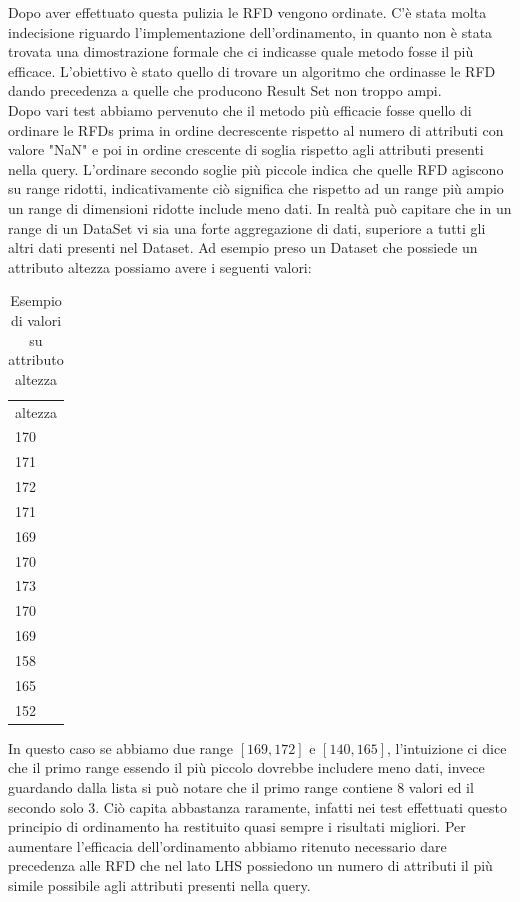 Dopo aver effettuato questa pulizia le RFD vengono ordinate. 
\newline
C'è stata molta indecisione riguardo l'implementazione dell'ordinamento, in quanto non è stata trovata una dimostrazione formale che ci indicasse quale metodo fosse il più efficace.
L'obiettivo è stato quello di trovare un algoritmo che ordinasse le RFD dando precedenza a quelle che producono Result Set non troppo ampi.
\\
Dopo vari test abbiamo pervenuto che il metodo più efficacie fosse quello di ordinare le RFDs prima in ordine decrescente rispetto al numero di attributi con valore "NaN" e poi in ordine crescente di soglia rispetto agli attributi presenti nella query. 
L'ordinare secondo soglie più piccole indica che quelle RFD agiscono su range ridotti, indicativamente ciò significa che rispetto ad un range più ampio un range di dimensioni ridotte include meno dati. In realtà può capitare che in un range di un DataSet vi sia una forte aggregazione di dati, superiore a tutti gli altri dati presenti nel Dataset. Ad esempio preso un Dataset che possiede un attributo altezza possiamo avere i seguenti valori:
\begin{table}[H]
    \centering
    \begin{tabular}{l }
    altezza \\
    170 \\
    171 \\
    172 \\
    171 \\
    169 \\
    170 \\
    173 \\
    170 \\
    169 \\
    158 \\
    165 \\
    152 \\
    \end{tabular}
    \caption{Esempio di valori su attributo altezza}
    \label{tab:height_list}
\end{table}
In questo caso se abbiamo due range $[169,172]$ e $[140,165]$, l'intuizione ci dice che il primo range essendo il più piccolo dovrebbe includere meno dati, invece guardando dalla lista si può notare che il primo range contiene 8 valori ed il secondo solo 3.
Ciò capita abbastanza raramente, infatti nei test effettuati questo principio di ordinamento ha restituito quasi sempre i risultati migliori.
Per aumentare l'efficacia dell'ordinamento abbiamo ritenuto necessario dare precedenza alle RFD che nel lato LHS possiedono un numero di attributi il più simile possibile agli attributi presenti nella query.
